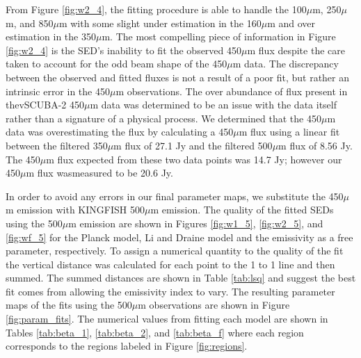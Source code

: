 From Figure \ref{fig:w2_4}, the fitting procedure is able to handle the 100$\mu$m, 250$\mu$m, and 850$\mu$m with some slight under estimation in the 160$\mu$m and over  estimation in the 350$\mu$m.  The most compelling piece of information in Figure \ref{fig:w2_4} is the SED's inability to fit the observed 450$\mu$m flux despite the care taken to account for the odd beam shape of the 450$\mu$m data.  The discrepancy between the observed and fitted fluxes is not a result of a poor fit, but rather an intrinsic error in the 450$\mu$m observations.  The over abundance of flux present in thevSCUBA-2 450$\mu$m data was determined to be an issue with the data itself rather than a signature of a physical process.  We determined that the 450$\mu$m data was overestimating the flux by calculating a 450$\mu$m flux using a linear fit between the filtered 350$\mu$m flux of 27.1 Jy and the filtered 500$\mu$m flux of 8.56 Jy.  The 450$\mu$m flux expected from these two data points was 14.7 Jy; however our 450$\mu$m flux wasmeasured to be 20.6 Jy.

In order to avoid any errors in our final parameter maps, we substitute the 450$\mu$m emission with KINGFISH 500$\mu$m emission.  The quality of the fitted SEDs using the 500$\mu$m emission are shown in Figures \ref{fig:w1_5}, \ref{fig:w2_5}, and \ref{fig:wf_5} for the Planck model, Li and Draine model and the emissivity as a free parameter, respectively.  To assign a numerical quantity to the quality of the fit the vertical distance was calculated for each point to the 1 to 1 line and then summed.  The summed distances are shown in Table \ref{tab:lsq} and suggest the best fit comes from allowing the emissivity index to vary.  The resulting parameter maps of the fits using the 500$\mu$m observations are shown in Figure \ref{fig:param_fits}. The numerical values from fitting each model are shown in Tables \ref{tab:beta_1}, \ref{tab:beta_2}, and \ref{tab:beta_f} where each region corresponds to the regions labeled in Figure \ref{fig:regions}.

